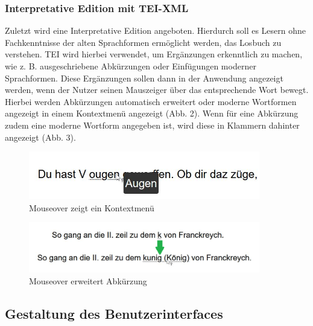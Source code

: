 \documentclass[12pt,a4paper]{article}
\begin{document}
	\subsubsection{Interpretative Edition mit TEI-XML}
		Zuletzt wird eine Interpretative Edition angeboten. Hierdurch soll es Lesern ohne Fachkenntnisse der alten Sprachformen 
		ermöglicht werden, das Losbuch zu verstehen. TEI wird hierbei verwendet, um Ergänzungen erkenntlich zu machen, wie z. B. 
		ausgeschriebene Abkürzungen oder Einfügungen moderner Sprachformen. Diese Ergänzungen sollen dann in der Anwendung angezeigt 
		werden, wenn der Nutzer seinen Mauszeiger über das entsprechende Wort bewegt. Hierbei werden Abkürzungen automatisch erweitert oder 
		moderne Wortformen angezeigt in einem Kontextmenü angezeigt (Abb. 2). 
		Wenn für eine Abkürzung zudem eine moderne Wortform angegeben ist, wird diese in Klammern dahinter angezeigt (Abb. 3).
			\begin{figure}[htbp]
				\centering
				\includegraphics[width=0.9\textwidth]{abb-2-tei-parsed-hover-ougen.JPG}
				\caption{Mouseover zeigt ein Kontextmenü}
				\label{Abbildung 2}
			\end{figure}
			\begin{figure}[htbp]
				\centering
				\includegraphics[width=0.9\textwidth]{k-kunig-koenig-onhover.png}
				\caption{Mouseover erweitert Abkürzung}
				\label{Abbildung 3}
			\end{figure}
	\subsection{Gestaltung des Benutzerinterfaces}
\end{document}
